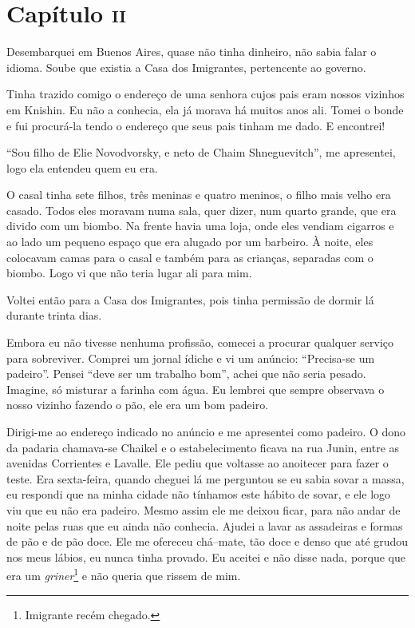 \chapter{Capítulo \textsc{ii}}

Desembarquei em Buenos Aires, quase não tinha dinheiro, não sabia falar
o idioma. Soube que existia a Casa dos Imigrantes, pertencente ao
governo.

Tinha trazido comigo o endereço de uma senhora cujos pais eram nossos
vizinhos em Knishin. Eu não a conhecia, ela já morava há muitos anos
ali. Tomei o bonde e fui procurá-la tendo o endereço que seus pais
tinham me dado. E encontrei!

``Sou filho de Elie Novodvorsky, e neto de Chaim Shneguevitch'', me
apresentei, logo ela entendeu quem eu era.

O casal tinha sete filhos, três meninas e quatro meninos, o filho mais
velho era casado. Todos eles moravam numa sala, quer dizer, num quarto
grande, que era divido com um biombo. Na frente havia uma loja, onde
eles vendiam cigarros e ao lado um pequeno espaço que era alugado por um
barbeiro. À noite, eles colocavam camas para o casal e também para as
crianças, separadas com o biombo. Logo vi que não teria lugar ali para
mim.

Voltei então para a Casa dos Imigrantes, pois tinha permissão de dormir
lá durante trinta dias.

Embora eu não tivesse nenhuma profissão, comecei a procurar qualquer
serviço para sobreviver. Comprei um jornal ídiche e vi um anúncio:
``Precisa-se um padeiro''. Pensei ``deve ser um trabalho bom'', achei
que não seria pesado. Imagine, só misturar a farinha com água. Eu
lembrei que sempre observava o nosso vizinho fazendo o pão, ele era um
bom padeiro.

Dirigi-me ao endereço indicado no anúncio e me apresentei como padeiro.
O dono da padaria chamava-se Chaikel e o estabelecimento ficava na rua
Junin, entre as avenidas Corrientes e Lavalle. Ele pediu que voltasse ao
anoitecer para fazer o teste. Era sexta-feira, quando cheguei lá me
perguntou se eu sabia sovar a massa, eu respondi que na minha cidade não
tínhamos este hábito de sovar, e ele logo viu que eu não era padeiro.
Mesmo assim ele me deixou ficar, para não andar de noite pelas ruas que
eu ainda não conhecia. Ajudei a lavar as assadeiras e formas de pão e de
pão doce. Ele me ofereceu chá--mate, tão doce e denso que até grudou nos
meus lábios, eu nunca tinha provado. Eu aceitei e não disse nada, porque
que era um \textit{griner}\footnote{Imigrante recém chegado.} e não queria
que rissem de mim.


